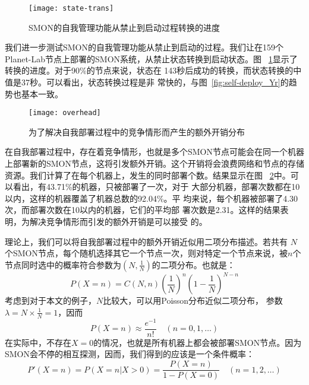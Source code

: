 \begin{figure}
\centering
  \begin{minipage}{0.8\linewidth}
    \centering
    \texttt{[image: state-trans]}
    \caption{SMON的自我管理功能从禁止到启动过程转换的进度}
    \label{fig:state-transition}
  \end{minipage}
\end{figure}

我们进一步测试SMON的自我管理功能从禁止到启动的过程。我们让在159个
Planet-Lab节点上部署的SMON系统，从禁止状态转换到启动状态。图~
\ref{fig:state-transition}显示了转换的进度。对于90\%的节点来说，状态在
143秒后成功的转换，而状态转换的中值是37秒。可以看出，状态转换过程是非
常快的，与图~\ref{fig:self-deploy_Yr}的趋势也基本一致。

\begin{figure}
\centering
  \begin{minipage}{0.8\linewidth}
    \centering
    \texttt{[image: overhead]}
    \caption{为了解决自我部署过程中的竞争情形而产生的额外开销分布}
    \label{fig:overhead}
  \end{minipage}
\end{figure}

在自我部署过程中，存在着竞争情形，也就是多个SMON节点可能会在同一个机器
上部署新的SMON节点，这将引发额外开销。这个开销将会浪费网络和节点的存储
资源。我们计算了在每个机器上，发生的同时部署个数。结果显示在图~
\ref{fig:overhead}中。可以看出，有43.71\%的机器，只被部署了一次，对于
大部分机器，部署次数都在10以内，这样的机器覆盖了机器总数的92.04\%。平
均来说，每个机器被部署了4.30次，而部署次数在10以内的机器，它们的平均部
署次数是2.31。这样的结果表明，为解决竞争情形而引发的额外开销是可以接受
的。

理论上，我们可以将自我部署过程中的额外开销近似用二项分布描述。若共有
$N$个SMON节点，每个随机选择其它一个节点一次，则对特定一个节点来说，被$n$个
节点同时选中的概率符合参数为$(N, \frac{1}{N})$的二项分布。也就是：
\begin{equation*}
P(X=n) = C(N, n) (\frac{1}{N})^n (1 - \frac{1}{N})^{N-n}
\end{equation*}
考虑到对于本文的例子，$N$比较大，可以用Poisson分布近似二项分布，
参数$\lambda = N \times \frac{1}{N} = 1$，因而
\begin{equation*}
P(X=n) \approx \frac{e^{-1}}{n!} \quad (n = 0, 1, \ldots )
\end{equation*}
在实际中，不存在$X=0$的情况，也就是所有机器上都会被部署SMON节点。因为
SMON会不停的相互探测，因而，我们得到的应该是一个条件概率：
\begin{equation*}
P'(X=n) = P(X=n | X > 0) = \frac{P(X=n)}{1- P(X=0)} \quad (n = 1, 2, \ldots )
\end{equation*}

